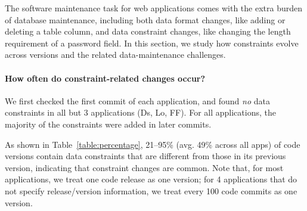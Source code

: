 
The software maintenance task for web applications comes with the
extra burden of database  maintenance, including both data format changes, 
like adding
or deleting a table column, and data constraint changes, like
changing the length requirement of a password field.
In this section, we study how constraints evolve across versions
and the related data-maintenance challenges.

\paragraph{\bf How often do constraint-related changes occur?} 
We first checked the first commit of each application, and found {\it no}
data constraints in all but 3 applications (Ds, Lo, FF).
For all applications, the majority of the constraints were added in later commits.

As shown in Table~\ref{table:percentage}, 21--95\% (avg. 49\% across all apps) of code versions contain
 data constraints that are different from those 
 in its previous version, 
 indicating that constraint changes are common. Note that, for
 most applications, we treat one code release as one version; for
 4 applications that do not specify release/version information,
 we treat every 100 code commits as one version.
 
 

 

